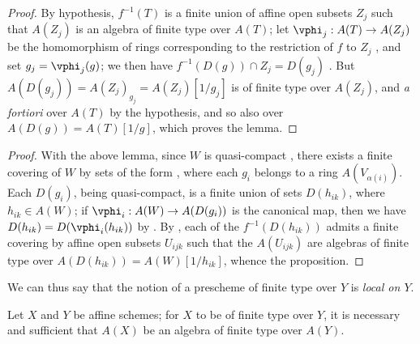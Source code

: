 \begin{proof}
By hypothesis, $f^{-1}(T)$ is a finite union of affine open subsets $Z_j$ such that $A(Z_j)$ is an algebra of finite type over $A(T)$;
let $\vphi_j:A(T)\to A(Z_j)$ be the homomorphism of rings corresponding to the restriction of $f$ to $Z_j$ , and set $g_j=\vphi_j(g)$;
we then have $f^{-1}(D(g))\cap Z_j=D(g_j)$ .
But $A(D(g_j))=A(Z_j)_{g_j}=A(Z_j)[1/g_j]$ is of finite type over $A(Z_j)$, and \emph{a fortiori} over $A(T)$ by the hypothesis, and so also over $A(D(g))=A(T)[1/g]$, which proves the lemma.
\end{proof}

\begin{proof}
With the above lemma, since $W$ is quasi-compact , there exists a finite covering of $W$ by sets of the form , where each $g_i$ belongs to a ring $A(V_{\alpha(i)})$.
Each $D(g_i)$, being quasi-compact, is a finite union of sets $D(h_{ik})$, where $h_{ik}\in A(W)$;
if $\vphi_i:A(W)\to A(D(g_i))$ is the canonical map, then we have $D(h_{ik})=D(\vphi_i(h_{ik}))$ by .
By , each of the $f^{-1}(D(h_{ik}))$ admits a finite covering by affine open subsets $U_{ijk}$ such that the $A(U_{ijk})$ are algebras of finite type over $A(D(h_{ik}))=A(W)[1/h_{ik}]$, whence the proposition.
\end{proof}

We can thus say that the notion of a prescheme of finite type over $Y$ is \emph{local on $Y$}.

\begin{proposition}[6.3.3]
\label{I.6.3.3}
Let $X$ and $Y$ be affine schemes;
for $X$ to be of finite type over $Y$, it is necessary and sufficient that $A(X)$ be an algebra of finite type over $A(Y)$.
\end{proposition}

